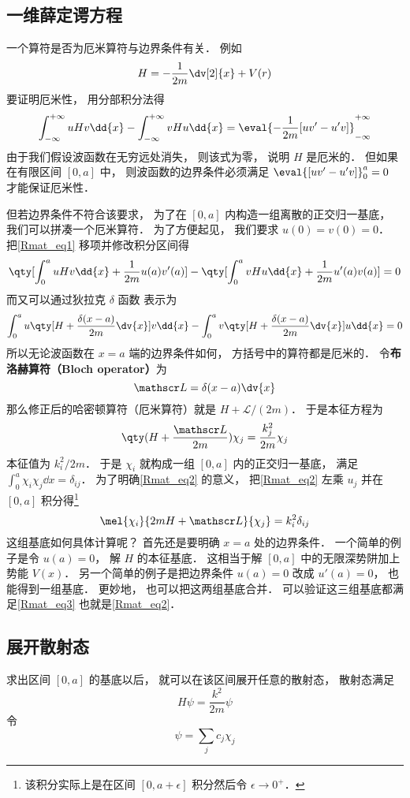 
\subsection{一维薛定谔方程}
一个算符是否为厄米算符与边界条件有关． 例如
\begin{equation}
H = -\frac{1}{2m}\dv[2]{x} + V(r)
\end{equation}
要证明厄米性， 用分部积分法得
\begin{equation}\label{Rmat_eq1}
\int_{-\infty}^{+\infty} uHv\dd{x} - \int_{-\infty}^{+\infty} vHu\dd{x}
= \eval{-\frac{1}{2m}[uv' - u'v]}_{-\infty}^{+\infty}
\end{equation}
由于我们假设波函数在无穷远处消失， 则该式为零， 说明 $H$ 是厄米的． 但如果在有限区间 $[0, a]$ 中， 则波函数的边界条件必须满足 $\eval{[uv' - u'v]}_{0}^{a} = 0$ 才能保证厄米性．

但若边界条件不符合该要求， 为了在 $[0,a]$ 内构造一组离散的正交归一基底， 我们可以拼凑一个厄米算符． 为了方便起见， 我们要求 $u(0) = v(0) = 0$． 把\autoref{Rmat_eq1} 移项并修改积分区间得
\begin{equation}
\qty[\int_{0}^{a} uHv\dd{x} + \frac{1}{2m}u(a)v'(a)] - \qty[\int_{0}^{a} vHu\dd{x} + \frac{1}{2m}u'(a)v(a)]
= 0
\end{equation}
而又可以通过狄拉克 $\delta$ 函数 表示为
\begin{equation}
\int_{0}^{a} u\qty[H + \frac{\delta(x-a)}{2m}\dv{x}] v\dd{x} -
\int_{0}^{a} v\qty[H + \frac{\delta(x-a)}{2m}\dv{x}] u\dd{x} = 0
\end{equation}
所以无论波函数在 $x=a$ 端的边界条件如何， 方括号中的算符都是厄米的． 令\textbf{布洛赫算符（Bloch operator）}为
\begin{equation}
\mathscr L = \delta(x-a)\dv{x}
\end{equation}
那么修正后的哈密顿算符（厄米算符）就是 $H + \mathscr L/(2m)$． 于是本征方程为
\begin{equation}\label{Rmat_eq2}
\qty(H + \frac{\mathscr L}{2m})\chi_j = \frac{k_j^2}{2m} \chi_j
\end{equation}
本征值为 ${k_i^2}/{2m}$． 于是 $\chi_i$ 就构成一组 $[0, a]$ 内的正交归一基底， 满足 $\int_0^a \chi_i \chi_j \dd{x} = \delta_{ij}$． 为了明确\autoref{Rmat_eq2} 的意义， 把\autoref{Rmat_eq2} 左乘 $u_j$ 并在 $[0,a]$ 积分得\footnote{该积分实际上是在区间 $[0,a+\epsilon]$ 积分然后令 $\epsilon\to 0^+$．}
\begin{equation}\label{Rmat_eq3}
\mel{\chi_i}{2mH + \mathscr L}{\chi_j} = k_i^2 \delta_{ij}
\end{equation}
这组基底如何具体计算呢？ 首先还是要明确 $x=a$ 处的边界条件． 一个简单的例子是令 $u(a) = 0$， 解 $H$ 的本征基底． 这相当于解 $[0,a]$ 中的无限深势阱加上势能 $V(x)$． 另一个简单的例子是把边界条件 $u(a) = 0$ 改成 $u'(a) = 0$， 也能得到一组基底． 更妙地， 也可以把这两组基底合并． 可以验证这三组基底都满足\autoref{Rmat_eq3} 也就是\autoref{Rmat_eq2}．

\subsection{展开散射态}
求出区间 $[0,a]$ 的基底以后， 就可以在该区间展开任意的散射态， 散射态满足
\begin{equation}
H\psi = \frac{k^2}{2m}\psi
\end{equation}
令
\begin{equation}
\psi = \sum_j c_j\chi_j
\end{equation}

